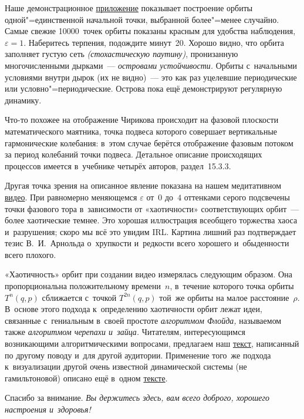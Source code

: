 \documentclass[a4paper,11pt]{article}
\theoremstyle{definition}
\begin{document}
Наше демонстрационное
\href{http://mech.math.msu.su/~shvetz/practicum/SCM.svg}{приложение} показывает
построение орбиты одной"=единственной начальной точки, выбранной более"=менее
случайно. Самые свежие 10000~точек орбиты показаны красным для удобства
наблюдения, $\varepsilon=1$. Наберитесь терпения, подождите минут~20. Хорошо
видно, что орбита заполняет густую сеть \emph{(стохастическую паутину)},
пронизанную многочисленными дырками~— \emph{островами устойчивости.} Орбиты
с~начальными условиями внутри дырок (их не видно)~— это как раз уцелевшие
периодические или условно"=периодические. Острова пока ещё демонстрируют
регулярную динамику.

Что-то похожее на отображение Чирикова происходит на фазовой плоскости
математического маятника, точка подвеса которого совершает вертикальные
гармонические колебания: в~этом случае берётся отображение фазовым потоком за
период колебаний точки подвеса. Детальное описание происходящих процессов
имеется в~учебнике четырёх авторов, раздел~15.3.3.

Другая точка зрения на описанное явление показана на нашем медитативном
\href{http://mech.math.msu.su/~shvetz/practicum/SCM.mp4}{видео}. При равномерно
меняющемся $\varepsilon$ от~$0$ до~$4$ оттенками серого подсвечены точки
фазового тора в~зависимости от «хаотичности» соответствующих орбит~— более
хаотические темнее. Это хорошая иллюстрация всеобщего торжества хаоса
и~разрушения; скоро мы всё это увидим IRL. Картина лишний раз подтверждает
тезис В.~И.~Арнольда о~хрупкости и~редкости всего хорошего и~обыденности всего
плохого.

«Хаотичность» орбит при создании видео измерялась следующим образом. Она
пропорциональна положительному времени~$n$, в~течение которого точка орбиты
$T^n(q,p)$ сближается с~точкой $T^{2n}(q,p)$ той~же орбиты на малое
расстояние~$\rho$. В~основе этого подхода к~определению хаотичности орбит лежат
идеи, связанные с~гениальным в~своей простоте \emph{алгоритмом Флойда,}
называемом также \emph{алгоритмом черепахи и~зайца.} Читателям, интересующимся
возникающими алгоритмическими вопросами, предлагаем наш
\href{http://mech.math.msu.su/~shvetz/54/inf/perl-problems/chDecimalFraction_sIdeas.xhtml#chDecimalFraction_sIdeas_sTortoiseAndHareMethod}{текст},
написанный по другому поводу и~для другой аудитории. Применение того~же подхода
к~визуализации другой очень известной динамической системы (не гамильтоновой)
описано ещё в~одном
\href{http://mech.math.msu.su/~shvetz/54/inf/perl-problems/chMandelbrotSet.xhtml}{тексте}.

\bigskip

Спасибо за внимание. \emph{Вы держитесь здесь, вам всего доброго, хорошего настроения
и~здоровья!}
\end{document}
